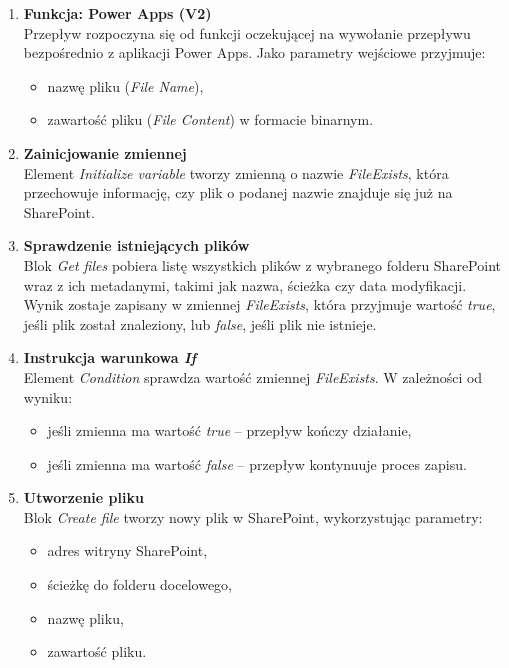 \begin{enumerate}
    \item \textbf{Funkcja: Power Apps (V2)} \\
          Przepływ rozpoczyna się od funkcji oczekującej na wywołanie przepływu bezpośrednio z aplikacji Power Apps. Jako parametry wejściowe przyjmuje:
          \begin{itemize}
              \item nazwę pliku (\textit{File Name}),
              \item zawartość pliku (\textit{File Content}) w formacie binarnym.
          \end{itemize}

    \item \textbf{Zainicjowanie zmiennej} \\
          Element \textit{Initialize variable} tworzy zmienną o nazwie \textit{FileExists}, która przechowuje informację, czy plik o podanej nazwie znajduje się już na SharePoint.

    \item \textbf{Sprawdzenie istniejących plików} \\
          Blok \textit{Get files} pobiera listę wszystkich plików z wybranego folderu SharePoint wraz z ich metadanymi, takimi jak nazwa, ścieżka czy data modyfikacji. Wynik zostaje zapisany w zmiennej \textit{FileExists}, która przyjmuje wartość \textit{true}, jeśli plik został znaleziony, lub \textit{false}, jeśli plik nie istnieje.

    \item \textbf{Instrukcja warunkowa \emph{If}} \\
          Element \textit{Condition} sprawdza wartość zmiennej \textit{FileExists}. W zależności od wyniku:
          \begin{itemize}
              \item jeśli zmienna ma wartość \textit{true} -- przepływ kończy działanie,
              \item jeśli zmienna ma wartość \textit{false} -- przepływ kontynuuje proces zapisu.
          \end{itemize}

    \item \textbf{Utworzenie pliku} \\
          Blok \textit{Create file} tworzy nowy plik w SharePoint, wykorzystując parametry:
          \begin{itemize}
              \item adres witryny SharePoint,
              \item ścieżkę do folderu docelowego,
              \item nazwę pliku,
              \item zawartość pliku.
          \end{itemize}


\end{enumerate}

